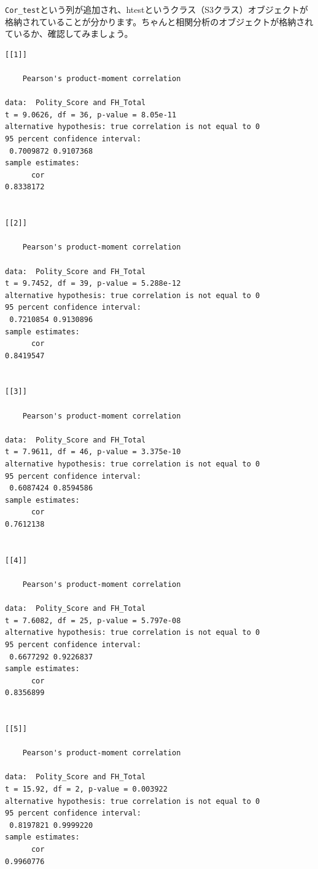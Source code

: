 \documentclass[
  a4paper,
  pandoc,
  ja=standard,
  jafont=haranoaji]{bxjsbook}
\newenvironment{Shaded}{\begin{snugshade}}{\end{snugshade}}
\newcommand{\NormalTok}[1]{\textcolor[rgb]{0.00,0.48,0.65}{#1}}
\newcommand{\SpecialCharTok}[1]{\textcolor[rgb]{0.37,0.37,0.37}{#1}}
\begin{document}
\texttt{Cor\_test}という列が追加され、htestというクラス（S3クラス）オブジェクトが格納されていることが分かります。ちゃんと相関分析のオブジェクトが格納されているか、確認してみましょう。

\begin{Shaded}
\end{Shaded}

\begin{verbatim}
[[1]]

    Pearson's product-moment correlation

data:  Polity_Score and FH_Total
t = 9.0626, df = 36, p-value = 8.05e-11
alternative hypothesis: true correlation is not equal to 0
95 percent confidence interval:
 0.7009872 0.9107368
sample estimates:
      cor 
0.8338172 


[[2]]

    Pearson's product-moment correlation

data:  Polity_Score and FH_Total
t = 9.7452, df = 39, p-value = 5.288e-12
alternative hypothesis: true correlation is not equal to 0
95 percent confidence interval:
 0.7210854 0.9130896
sample estimates:
      cor 
0.8419547 


[[3]]

    Pearson's product-moment correlation

data:  Polity_Score and FH_Total
t = 7.9611, df = 46, p-value = 3.375e-10
alternative hypothesis: true correlation is not equal to 0
95 percent confidence interval:
 0.6087424 0.8594586
sample estimates:
      cor 
0.7612138 


[[4]]

    Pearson's product-moment correlation

data:  Polity_Score and FH_Total
t = 7.6082, df = 25, p-value = 5.797e-08
alternative hypothesis: true correlation is not equal to 0
95 percent confidence interval:
 0.6677292 0.9226837
sample estimates:
      cor 
0.8356899 


[[5]]

    Pearson's product-moment correlation

data:  Polity_Score and FH_Total
t = 15.92, df = 2, p-value = 0.003922
alternative hypothesis: true correlation is not equal to 0
95 percent confidence interval:
 0.8197821 0.9999220
sample estimates:
      cor 
0.9960776 
\end{verbatim}
\end{document}
